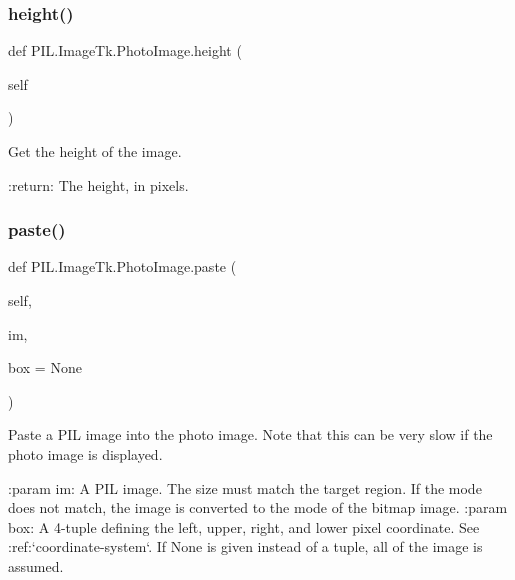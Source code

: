 \subsubsection{\texorpdfstring{height()}{height()}}
{\footnotesize\ttfamily def P\+I\+L.\+Image\+Tk.\+Photo\+Image.\+height (\begin{DoxyParamCaption}\item[{}]{self }\end{DoxyParamCaption})}

\begin{DoxyVerb}Get the height of the image.

:return: The height, in pixels.
\end{DoxyVerb}
 \mbox{\label{classPIL_1_1ImageTk_1_1PhotoImage_a892073f80f69cc2318c610ec96784b05}} 
\subsubsection{\texorpdfstring{paste()}{paste()}}
{\footnotesize\ttfamily def P\+I\+L.\+Image\+Tk.\+Photo\+Image.\+paste (\begin{DoxyParamCaption}\item[{}]{self,  }\item[{}]{im,  }\item[{}]{box = {\ttfamily None} }\end{DoxyParamCaption})}

\begin{DoxyVerb}Paste a PIL image into the photo image.  Note that this can
be very slow if the photo image is displayed.

:param im: A PIL image. The size must match the target region.  If the
   mode does not match, the image is converted to the mode of
   the bitmap image.
:param box: A 4-tuple defining the left, upper, right, and lower pixel
    coordinate. See :ref:`coordinate-system`. If None is given
    instead of a tuple, all of the image is assumed.
\end{DoxyVerb}
 \mbox{\label{classPIL_1_1ImageTk_1_1PhotoImage_aa746655808ee6dff1c2480f962262c75}} 
